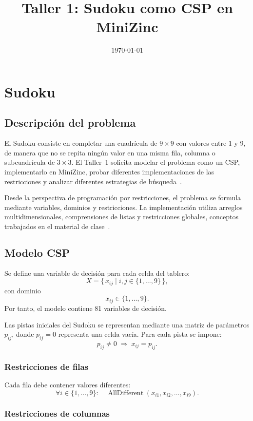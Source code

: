 \documentclass[12pt]{article}
\title{Taller 1: Sudoku como CSP en MiniZinc}
\author{}
\date{\today}
\begin{document}
\maketitle

\section{Sudoku}

\subsection{Descripción del problema}

El Sudoku consiste en completar una cuadrícula de $9\times 9$ con valores entre 1 y 9, de manera que no se repita ningún valor en una misma fila, columna o subcuadrícula de $3\times 3$. El Taller~1 solicita modelar el problema como un CSP, implementarlo en MiniZinc, probar diferentes implementaciones de las restricciones y analizar diferentes estrategias de búsqueda~\cite{taller1}.

Desde la perspectiva de programación por restricciones, el problema se formula mediante variables, dominios y restricciones. La implementación utiliza arreglos multidimensionales, comprensiones de listas y restricciones globales, conceptos trabajados en el material de clase~\cite{clase5}.

\subsection{Modelo CSP}

Se define una variable de decisión para cada celda del tablero:
\[
X=\{\,x_{ij}\mid i,j\in\{1,\ldots,9\}\,\},
\]
con dominio
\[
x_{ij}\in\{1,\ldots,9\}.
\]
Por tanto, el modelo contiene 81 variables de decisión.

Las pistas iniciales del Sudoku se representan mediante una matriz de parámetros $p_{ij}$, donde $p_{ij}=0$ representa una celda vacía. Para cada pista se impone:
\[
p_{ij}\neq 0 \;\Rightarrow\; x_{ij}=p_{ij}.
\]

\subsubsection{Restricciones de filas}

Cada fila debe contener valores diferentes:
\[
\forall i\in\{1,\ldots,9\}:\quad
\operatorname{AllDifferent}(x_{i1},x_{i2},\ldots,x_{i9}).
\]

\subsubsection{Restricciones de columnas}
\end{document}
